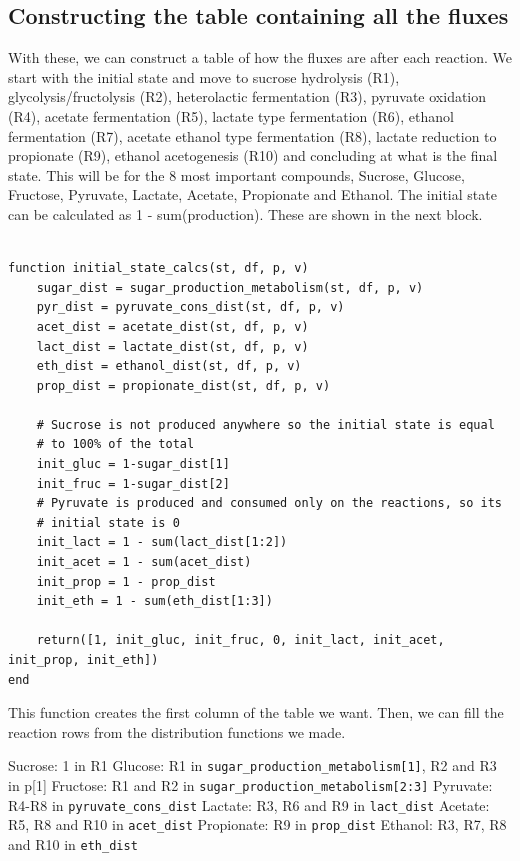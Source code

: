 \documentclass[11pt]{article}
\begin{document}
\subsection{Constructing the table containing all the fluxes}
\label{sec:org0e4d1e7}
With these, we can construct a table of how the fluxes are after each reaction. We start with the initial state and move to sucrose hydrolysis (R1), glycolysis/fructolysis (R2), heterolactic fermentation (R3), pyruvate oxidation (R4), acetate fermentation (R5), lactate type fermentation (R6), ethanol fermentation (R7), acetate ethanol type fermentation (R8), lactate reduction to propionate (R9), ethanol acetogenesis (R10) and concluding at what is the final state. This will be for the 8 most important compounds, Sucrose, Glucose, Fructose, Pyruvate, Lactate, Acetate, Propionate and Ethanol. The initial state can be calculated as 1 - sum(production). These are shown in the next block.

\begin{verbatim}

function initial_state_calcs(st, df, p, v)
    sugar_dist = sugar_production_metabolism(st, df, p, v)
    pyr_dist = pyruvate_cons_dist(st, df, p, v)
    acet_dist = acetate_dist(st, df, p, v)
    lact_dist = lactate_dist(st, df, p, v)
    eth_dist = ethanol_dist(st, df, p, v)
    prop_dist = propionate_dist(st, df, p, v)

    # Sucrose is not produced anywhere so the initial state is equal
    # to 100% of the total
    init_gluc = 1-sugar_dist[1]
    init_fruc = 1-sugar_dist[2]
    # Pyruvate is produced and consumed only on the reactions, so its
    # initial state is 0
    init_lact = 1 - sum(lact_dist[1:2])
    init_acet = 1 - sum(acet_dist)
    init_prop = 1 - prop_dist
    init_eth = 1 - sum(eth_dist[1:3])

    return([1, init_gluc, init_fruc, 0, init_lact, init_acet, init_prop, init_eth])
end

\end{verbatim}

This function creates the first column of the table we want. Then, we can fill the reaction rows from the distribution functions we made.

Sucrose: 1 in R1
Glucose: R1 in \texttt{sugar\_production\_metabolism[1]}, R2 and R3 in p[1]
Fructose: R1 and R2 in \texttt{sugar\_production\_metabolism[2:3]}
Pyruvate: R4-R8 in \texttt{pyruvate\_cons\_dist}
Lactate: R3, R6 and R9 in \texttt{lact\_dist}
Acetate: R5, R8 and R10 in \texttt{acet\_dist}
Propionate: R9 in \texttt{prop\_dist}
Ethanol: R3, R7, R8 and R10 in \texttt{eth\_dist}
\end{document}
